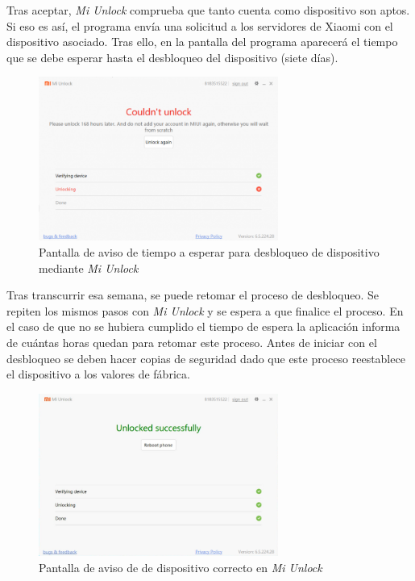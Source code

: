 \documentclass[12pt,a4paper,onecolumn,oneside]{report}
\begin{document}
Tras aceptar, \textit{Mi Unlock} comprueba que tanto cuenta como dispositivo son aptos. Si eso es así, el programa envía una solicitud a los servidores de Xiaomi con el dispositivo asociado. Tras ello, en la pantalla del programa aparecerá el tiempo que se debe esperar hasta el desbloqueo del dispositivo (siete días).

\begin{figure}[H] 
\centering
  \includegraphics[width=0.7\textwidth]{figuras/root4.png}
  \caption[Pantalla de aviso de tiempo a esperar para desbloqueo de dispositivo mediante \textit{Mi Unlock}]{Pantalla de aviso de tiempo a esperar para desbloqueo de dispositivo mediante \textit{Mi Unlock}\\
  }
  \label{fig:root4}
\end{figure}

Tras transcurrir esa semana, se puede retomar el proceso de desbloqueo. Se repiten los mismos pasos con \textit{Mi Unlock} y se espera a que finalice el proceso. En el caso de que no se hubiera cumplido el tiempo de espera la aplicación informa de cuántas horas quedan para retomar este proceso. Antes de iniciar con el desbloqueo se deben hacer copias de seguridad dado que este proceso reestablece el dispositivo a los valores de fábrica.

\begin{figure}[H] 
\centering
  \includegraphics[width=0.7\textwidth]{figuras/root5.png}
  \caption[Pantalla de aviso de de dispositivo correcto en \textit{Mi Unlock}]{Pantalla de aviso de de dispositivo correcto en \textit{Mi Unlock}\\
  }
  \label{fig:root5}
\end{figure}
\end{document}
